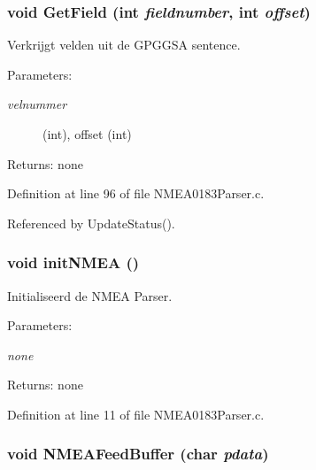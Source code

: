 \subsubsection{\setlength{\rightskip}{0pt plus 5cm}void GetField (int {\em fieldnumber}, int {\em offset})}\label{_n_m_e_a0183_parser_8c_9520f912aa8753453f8806988890c71a}


Verkrijgt velden uit de GPGGSA sentence. 

\begin{Desc}
\item[Parameters:]
\begin{description}
\item[{\em velnummer}](int), offset (int) \end{description}
\end{Desc}
\begin{Desc}
\item[Returns:]none \end{Desc}


Definition at line 96 of file NMEA0183Parser.c.

Referenced by UpdateStatus().
\subsubsection{\setlength{\rightskip}{0pt plus 5cm}void initNMEA ()}\label{_n_m_e_a0183_parser_8c_f3da002283bf981950a10d5dd7f61abd}


Initialiseerd de NMEA Parser. 

\begin{Desc}
\item[Parameters:]
\begin{description}
\item[{\em none}]\end{description}
\end{Desc}
\begin{Desc}
\item[Returns:]none \end{Desc}


Definition at line 11 of file NMEA0183Parser.c.
\subsubsection{\setlength{\rightskip}{0pt plus 5cm}void NMEAFeedBuffer (char {\em pdata})}\label{_n_m_e_a0183_parser_8c_4d3e943e2307c87292092624bc0eff55}


